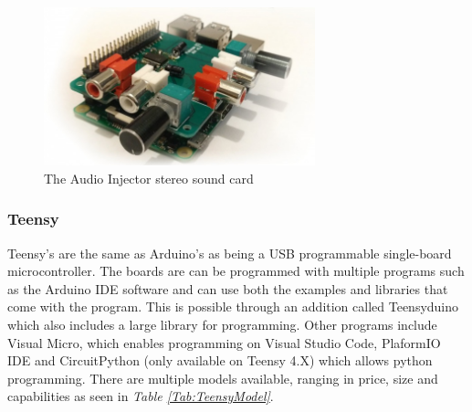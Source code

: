 \begin{figure}[h]
    \centering
    \includegraphics[width=0.70\textwidth]{graphics/rpisoundcard.jpg}
    \caption{The Audio Injector stereo sound card \cite{noauthor_rpi_nodate}}
    \label{fig:rpisoundcard}
\end{figure}


\subsubsection{Teensy}

Teensy's are the same as Arduino's as being a USB programmable single-board microcontroller.
The boards are can be programmed with multiple programs such as the Arduino IDE software and can use both the examples and libraries that come with the program.
This is possible through an addition called Teensyduino which also includes a large library for programming.
Other programs include Visual Micro, which enables programming on Visual Studio Code, PlaformIO IDE and CircuitPython (only available on Teensy 4.X) which allows python programming.
There are multiple models available, ranging in price, size and capabilities as seen in \textit{Table \ref{Tab:TeensyModel}}.


